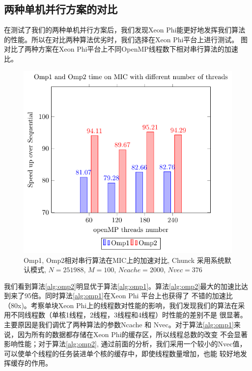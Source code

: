 \subsection{两种单机并行方案的对比} %
\label{sub:compareV1V2}

在测试了我们的两种单机并行方案后，我们发现Xeon Phi能更好地发挥我们算法的性能。所以在对比两种算法优劣时，我们选择在Xeon Phi平台上进行测试。
图\label{fig:compareV1V2}对比了两种方案在Xeon Phi平台上不同OpenMP线程数下相对串行算法的加速比。
\begin{figure}[!t]
   \centering
   \includegraphics[width=\textwidth]{chap5/Figures/BS-Core-bar.pdf}
   \caption{Omp1, Omp2相对串行算法在MIC上的加速对比, Chunck 采用系统默认模式, $N=251988$, $M=100$, $Ncache=2000$, $Nvec=376$}
   \label{fig:compareV1V2}
\end{figure}
我们看到算法\ref{alg:omp2}明显优于算法\ref{alg:omp1}。算法\ref{alg:omp2}最大的加速比达到来了95倍。同时算法\ref{alg:omp1}在Xeon Phi 平台上也获得了
不错的加速比（80x)。考察单块Xeon Phi上的线程数对性能的影响，我们发现我们的算法在采用不同线程数（单核1线程，2线程，3线程和4线程）时性能的差别不是
很显著。主要原因是我们调优了两种算法的参数Ncache 和 Nvec。对于算法\ref{alg:omp1}来说，因为所有的数据都存储在Xeon Phi的缓存区，所以线程总数的改变
不会显著影响性能；对于算法\ref{alg:omp2}, 通过前面的分析，我们采用一个较小的Nvec值，可以使单个线程的任务装进单个核的缓存中，即使线程数量增加，也能
较好地发挥缓存的作用。

